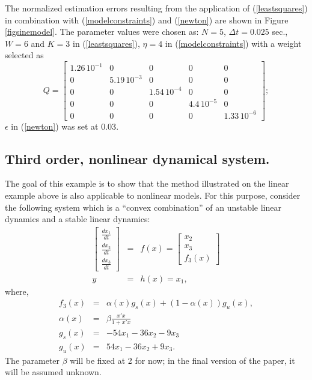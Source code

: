 The normalized estimation errors resulting
from the application of (\ref{leastsquares}) in combination with
(\ref{modelconstraints})
and (\ref{newton}) are shown in
Figure \ref{figsinemodel}.   The parameter values were chosen as: $N=5$, 
$\Delta t = 0.025$
sec., $W=6$ and $K=3$  in (\ref{leastsquares}), $\eta = 4$ in
(\ref{modelconstraints}) 
with a weight selected as
\begin{equation} Q = 
\left[ \begin{array}{ccccc} 1.26 \, 10^{-1} & 0 & 0 & 0 & 0 \\
0  & 5.19 \, 10^{-3}  & 0 & 0 & 0 \\
0 & 0 & 1.54 \, 10^{-4} & 0 & 0 \\
0 & 0 & 0 & 4.4 \, 10^{-5} & 0 \\
0 & 0 & 0 & 0 & 1.33 \, 10^{-6}
\end{array} \right];
\end{equation}
$\epsilon$ in (\ref{newton}) was set at $0.03$.  

\subsection{Third order, nonlinear dynamical system.}

The goal of this example is to show that the method illustrated on the
linear example above is also applicable to nonlinear models.  For this
purpose, consider the following system which is a ``convex combination''
of an unstable linear dynamics and a stable linear dynamics:
\begin{eqnarray}
\left[ \begin{array}{c} \frac{dx_1}{dt} \\ \frac{dx_2}{dt}  
\\ \frac{dx_3}{dt} \end{array} \right] 
& = & f(x) = 
\left[ \begin{array}{c} x_2 \\ x_3 \\ f_3(x)
\end{array} \right]   \label{nonlinmodel} \\
y & = & h(x) = x_1 , \nonumber 
\label{dynamic}
\end{eqnarray}
where,
\begin{eqnarray*}
f_3(x) & = & \alpha(x) g_s(x) + (1 - \alpha(x)) g_u(x), \\
\alpha(x)& =& \beta  \frac{x'x}{1 + x'x} \\ 
g_s(x) & = & -54 x_1 - 36 x_2 - 9 x_3 \\
g_u(x) & = & 54 x_1 - 36 x_2 + 9 x_3.
\end{eqnarray*}
The parameter $\beta$ will be fixed at 2 for now; in the final version of the
paper, it will be assumed unknown.  

